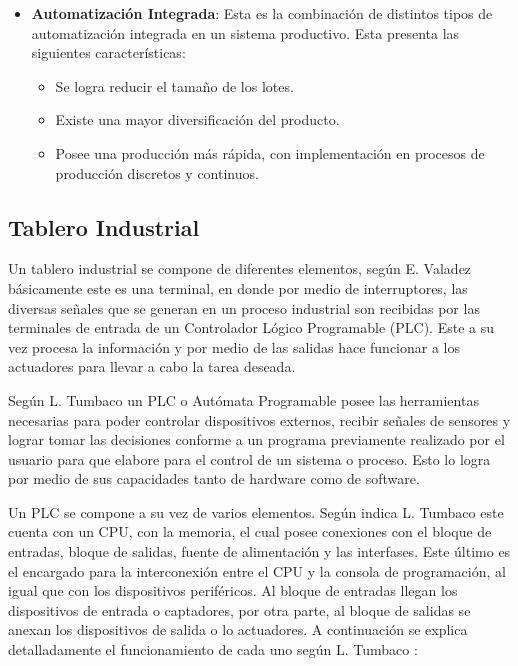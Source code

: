 \begin{itemize}
  \item \textbf{Automatización Integrada}: Esta es la combinación de distintos tipos de automatización integrada en un sistema productivo. Esta presenta las siguientes características:
   \begin{itemize}
  \item Se logra reducir el tamaño de los lotes.
  \item Existe una mayor diversificación del producto.
  \item Posee una producción más rápida, con implementación en procesos de producción discretos y continuos.
  \end{itemize}
\end{itemize}


\subsection*{Tablero Industrial}

Un tablero industrial se compone de diferentes elementos, según E. Valadez \cite{valadez2002tablero} básicamente este es una terminal, en donde por medio de interruptores, las diversas señales que se generan en un proceso industrial son recibidas por las terminales de entrada de un Controlador Lógico Programable (PLC). Este a su vez procesa la información y por medio de las salidas hace funcionar a los actuadores para llevar a cabo la tarea deseada.

Según L. Tumbaco \cite{tumbaco2013diseno} un PLC o Autómata Programable posee las herramientas necesarias para poder controlar dispositivos externos, recibir señales de sensores y lograr tomar las decisiones conforme a un programa previamente realizado por el usuario para que elabore para el control de un sistema o proceso. Esto lo logra por medio de sus capacidades tanto de hardware como de software.

Un PLC se compone a su vez de varios elementos. Según indica L. Tumbaco \cite{tumbaco2013diseno} este cuenta con un CPU, con la memoria, el cual posee conexiones con el bloque de entradas, bloque de salidas, fuente de alimentación y las interfases. Este último es el encargado para la interconexión entre el CPU y la consola de programación, al igual que con los dispositivos periféricos. Al bloque de entradas llegan los dispositivos de entrada o captadores, por otra parte, al bloque de salidas se anexan los dispositivos de salida o lo actuadores. A continuación se explica detalladamente el funcionamiento de cada uno según L. Tumbaco \cite{tumbaco2013diseno}:

